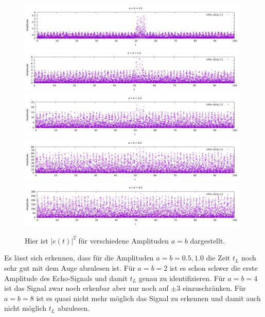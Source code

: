 \documentclass[ngerman]{scrartcl}
\begin{document}
\begin{figure}[htbp]
	\centering
	\includegraphics[width=0.98\textwidth]{plots/echo/0.5}
	\includegraphics[width=0.98\textwidth]{plots/echo/1.0}
	\includegraphics[width=0.98\textwidth]{plots/echo/2.0}
	\includegraphics[width=0.98\textwidth]{plots/echo/4.0}
	\includegraphics[width=0.98\textwidth]{plots/echo/8.0}
	\caption[$|e(t)|^2$]{Hier ist $|e(t)|^2$ für verschiedene Amplituden $a=b$ dargestellt.}
	\label{fig:2.1}
\end{figure} 
Es lässt sich erkennen, dass für die Amplituden
$a=b=0.5, 1.0$ die Zeit $t_L$ noch sehr gut mit dem Auge abzulesen ist.
Für $a=b=2$ ist es schon schwer die erste Amplitude des Echo-Signals
und damit $t_L$ genau zu identifizieren.
Für $a=b=4$ ist das Signal zwar noch erkenbar aber nur noch auf $\pm3$ einzuschr\"anken.
Für $a=b=8$ ist es quasi nicht mehr möglich das Signal zu erkennen und damit auch nicht möglich $t_L$ abzulesen. 

\subsection{}
\end{document}
